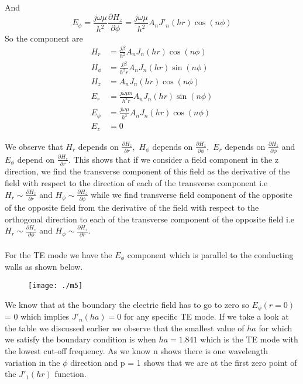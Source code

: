       And
      $$ E_\phi = \frac{j\omega\mu}{h^2 }\frac{\partial H_z}{\partial \phi} = \frac{j\omega\mu }{h^2 }A_nJ'_n(hr)\cos(n\phi)$$
      So the component are
      \begin{align*}
      H_r &= \frac{j\beta}{h^2 }A_nJ_n(hr)\cos(n\phi)\\ H_\phi &= \frac{j\beta}{h^2 r}A_nJ_n(hr)\sin(n\phi)\\
      H_z &= A_nJ_n(hr)\cos(n\phi)\\
      E_r &= \frac{j\omega\mu n}{h^2 r}A_nJ_n(hr)\sin(n\phi)\\
      E_\phi &= \frac{j\omega\mu }{h^2 }A_nJ_n(hr)\cos(n\phi)\\
      E_z & = 0
      \end{align*}
      
      We observe that $H_r$ depends on $\frac{\partial H_z}{\partial r},$ $H_\phi$ depends on $\frac{\partial H_z}{\partial \phi},$  $E_r$ depends on $\frac{\partial H_z}{\partial \phi}$ and $E_\phi$ depend on $\frac{\partial H_z}{\partial r}$. This shows that if we consider a field component in the z direction, we find the transverse component of this field as the derivative of the field with respect to the direction of each of the transverse component i.e $H_r \sim \frac{\partial H_z}{\partial r}$ and $H_\phi \sim \frac{\partial H_z}{\partial \phi}$  while we find transverse field component of the opposite of the opposite field from the derivative of the field with respect to the orthogonal direction to each of the transverse 	component of the opposite field i.e $H_r \sim \frac{\partial H_z}{\partial \phi}$ and $H_\phi \sim \frac{\partial H_z}{\partial r}$.\\\\
      For the TE mode we have the $E_\phi$ component  which is parallel to the conducting walls as shown below.
      \begin{figure}[H]
      	\centering
      	\texttt{[image: ./m5]}
      	\label{fig:m5}
      \end{figure}
      We know that at the boundary the electric field has to go to zero so $E_\phi(r = 0)$ = 0 which implies $J'_n(ha) = 0$ for any specific TE mode. If we take a look at the table we discussed earlier we observe that the smallest value  of $ha$ for which we satisfy the boundary condition is when $ha= 1.841$ which is the TE mode with the lowest cut-off frequency. As we know n shows there is one wavelength variation in the $\phi$ direction and p = 1 shows that we are at  the first zero point of the $J'_1(hr)$ function.\\
